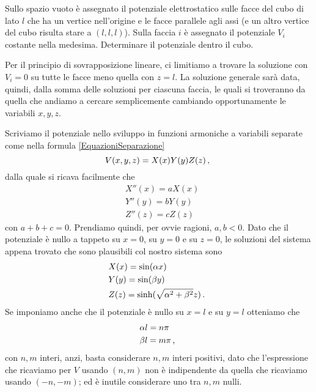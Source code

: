 \documentclass[../main.tex]{subfiles}
\begin{document}

\textex
Sullo spazio vuoto è assegnato il potenziale elettrostatico sulle facce del cubo di lato $l$ che ha un vertice nell'origine e le facce parallele agli assi (e un altro vertice del cubo risulta stare a $(l,l,l)$). Sulla faccia $i$ è assegnato il potenziale $V_i$ costante nella medesima. Determinare il potenziale dentro il cubo.

\solution

Per il principio di sovrapposizione lineare, ci limitiamo a trovare la soluzione con $V_i=0$ su tutte le facce meno quella con $z=l$. La soluzione generale sarà data, quindi, dalla somma delle soluzioni per ciascuna faccia, le quali si troveranno da quella che andiamo a cercare semplicemente cambiando opportunamente le variabili $x,y,z$.

Scriviamo il potenziale nello sviluppo in funzioni armoniche a variabili separate come nella formula \cref{EquazioniSeparazione}
\[
	V(x,y,z)=X(x)Y(y)Z(z)\, \text{, }
\]
dalla quale si ricava facilmente che
\begin{align*}
	&X''(x)=aX(x)\\
	&Y''(y)=bY(y)\\
	&Z''(z)=cZ(z)
\end{align*}
con $a+b+c=0$. Prendiamo quindi, per ovvie ragioni, $a,b<0$. Dato che il potenziale è nullo a tappeto su $x=0$, su $y=0$ e su $z=0$, le soluzioni del sistema appena trovato che sono plausibili col nostro sistema sono
\begin{align*}
	&X(x)=\sin(\alpha x)\\
	&Y(y)=\sin(\beta y)\\
	&Z(z)=\sinh(\sqrt{\alpha^2+\beta^2} z)\, \text{. }
\end{align*}
Se imponiamo anche che il potenziale è nullo su $x=l$ e su $y=l$ otteniamo che
\begin{align*}
	&\alpha l = n\pi\\
	&\beta l = m\pi\, \text{, }
\end{align*}
con $n,m$ interi, anzi, basta considerare $n,m$ interi positivi, dato che l'espressione che ricaviamo per $V$ usando $(n,m)$ non è indipendente da quella che ricaviamo usando $(-n,-m)$; ed è inutile considerare uno tra $n,m$ nulli.
\end{document}
